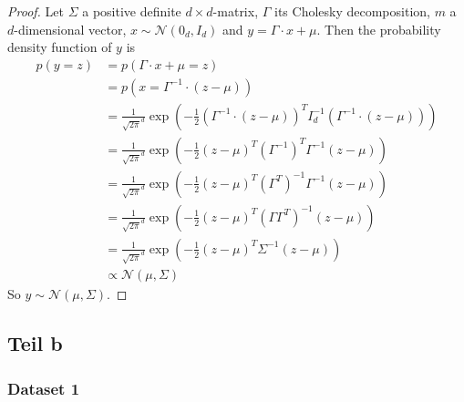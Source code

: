 \documentclass[10pt,a4paper]{article}
\begin{document}
\begin{proof}
  Let $\Sigma$ a positive definite $d \times d$-matrix, $\Gamma$ its Cholesky
  decomposition, $m$ a $d$-dimensional vector, $x \sim \mathcal{N}(0_d, I_d)$
  and $y = \Gamma \cdot x + \mu$. Then the probability density function of $y$
  is
  \begin{align*}
    p(y = z) & = p(\Gamma \cdot x + \mu = z)\\
             & = p(x = \Gamma^{-1} \cdot (z - \mu))\\
             & = \frac{1}{\sqrt{2 \pi}^d} \exp \left( -\frac{1}{2} (\Gamma^{-1} \cdot (z - \mu))^T I_d^{-1} (\Gamma^{-1} \cdot (z - \mu)) \right)\\
             & = \frac{1}{\sqrt{2 \pi}^d} \exp \left( -\frac{1}{2} (z - \mu)^T (\Gamma^{-1})^T \Gamma^{-1} (z - \mu) \right)\\
             & = \frac{1}{\sqrt{2 \pi}^d} \exp \left( -\frac{1}{2} (z - \mu)^T (\Gamma^T)^{-1} \Gamma^{-1} (z - \mu) \right)\\
             & = \frac{1}{\sqrt{2 \pi}^d} \exp \left( -\frac{1}{2} (z - \mu)^T (\Gamma\Gamma^T)^{-1} (z - \mu) \right)\\
             & = \frac{1}{\sqrt{2 \pi}^d} \exp \left( -\frac{1}{2} (z - \mu)^T \Sigma^{-1} (z - \mu) \right)\\
             & \propto \mathcal{N}(\mu, \Sigma)
  \end{align*}
  So $y \sim \mathcal{N}(\mu, \Sigma)$.
\end{proof}

\subsection{Teil b}

\subsubsection{Dataset 1}
\end{document}
